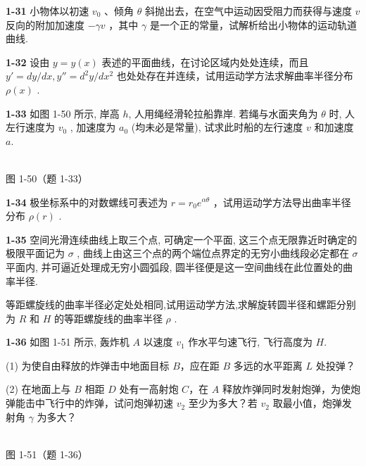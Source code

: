 \newpage

\textbf{1-31} 小物体以初速 $v_{0}$ 、倾角 $\theta$ 斜抛出去，在空气中运动因受阻力而获得与速度 $v$ 反向的附加加速度 $-\gamma v$ ，其中 $\gamma$ 是一个正的常量，试解析给出小物体的运动轨道曲线.

\newpage

\textbf{1-32} 设由 $y=y(x)$ 表述的平面曲线，在讨论区域内处处连续，而且 $y' = dy/dx, y'' = d^{2}y/dx^{2}$ 也处处存在并连续，试用运动学方法求解曲率半径分布 $\rho(x)$ .

\newpage

\textbf{1-33} 如图 1-50 所示, 岸高 $h$, 人用绳经滑轮拉船靠岸. 若绳与水面夹角为 $\theta$ 时, 人左行速度为 $v_{0}$ , 加速度为 $a_{0}$ (均未必是常量), 试求此时船的左行速度 $v$ 和加速度 $a$.
\begin{center}
\resizebox{0.48\textwidth}{!}{}\\[4pt]
{\small 图 1-50（题 1-33）}
\end{center}

\newpage

\textbf{1-34} 极坐标系中的对数螺线可表述为 $r=r_{0}e^{\alpha\theta}$ ，试用运动学方法导出曲率半径分布 $\rho(r)$ .

\newpage

\textbf{1-35} 空间光滑连续曲线上取三个点, 可确定一个平面, 这三个点无限靠近时确定的极限平面记为 $\sigma$ , 曲线上由这三个点的两个端位点界定的无穷小曲线段必定都在 $\sigma$ 平面内, 并可逼近处理成无穷小圆弧段, 圆半径便是这一空间曲线在此位置处的曲率半径.

等距螺旋线的曲率半径必定处处相同,试用运动学方法,求解旋转圆半径和螺距分别为 $R$ 和 $H$ 的等距螺旋线的曲率半径 $\rho$ .

\newpage

\textbf{1-36} 如图 1-51 所示, 轰炸机 $A$ 以速度 $v_{1}$ 作水平匀速飞行, 飞行高度为 $H$.

(1) 为使自由释放的炸弹击中地面目标 $B$，应在距 $B$ 多远的水平距离 $L$ 处投弹？

(2) 在地面上与 $B$ 相距 $D$ 处有一高射炮 $C$，在 $A$ 释放炸弹同时发射炮弹，为使炮弹能击中飞行中的炸弹，试问炮弹初速 $v_{2}$ 至少为多大？若 $v_{2}$ 取最小值，炮弹发射角 $\gamma$ 为多大？
\begin{center}
\resizebox{0.40\textwidth}{!}{}\\[4pt]
{\small 图 1-51（题 1-36）}
\end{center}

